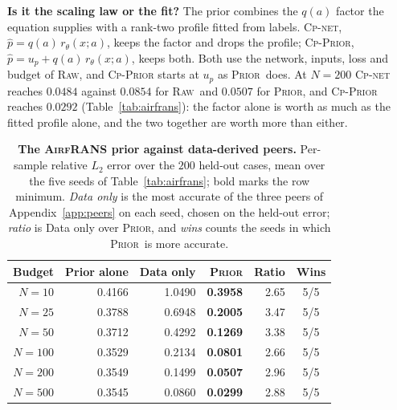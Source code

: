 \documentclass{article}
\newcommand{\armraw}{\textsc{Raw}}
\newcommand{\armprior}{\textsc{Prior}}
\begin{document}
\textbf{Is it the scaling law or the fit?} The prior combines the $q(a)$ factor the
equation supplies with a rank-two profile fitted from labels. \textsc{Cp-net},
$\hat p=q(a)\,r_\theta(x;a)$, keeps the factor and drops the profile;
\textsc{Cp-Prior}, $\hat p=u_p+q(a)\,r_\theta(x;a)$, keeps both. Both use the network,
inputs, loss and budget of \armraw, and \textsc{Cp-Prior} starts at $u_p$ as \armprior\
does. At $N{=}200$ \textsc{Cp-net} reaches $0.0484$ against $0.0854$ for \armraw\ and
$0.0507$ for \armprior, and \textsc{Cp-Prior} reaches $0.0292$
(Table~\ref{tab:airfrans}): the factor alone is worth as much as the fitted profile
alone, and the two together are worth more than either.

\begin{table}[t]
\centering
\caption{\textbf{The \textsc{AirfRANS} prior against data-derived peers.} Per-sample
relative $L_2$ error over the $200$ held-out cases, mean over the five seeds of
Table~\ref{tab:airfrans}; bold marks the row minimum. \emph{Data only} is the most
accurate of the three peers of Appendix~\ref{app:peers} on each seed, chosen on the
held-out error; \emph{ratio} is Data only over \armprior, and \emph{wins} counts the
seeds in which \armprior\ is more accurate.}
\label{tab:airfrans-full}
\footnotesize
\setlength{\tabcolsep}{17pt}
\renewcommand{\arraystretch}{0.7}
  \vspace{1mm}
\begin{tabular}{@{}rrrrrc@{}}
\toprule
Budget & Prior alone & Data only & \armprior & Ratio & Wins \\
\midrule
$N=10$  & 0.4166 & 1.0490 & \textbf{0.3958} & 2.65 & 5/5 \\
$N=25$  & 0.3788 & 0.6948 & \textbf{0.2005} & 3.47 & 5/5 \\
$N=50$  & 0.3712 & 0.4292 & \textbf{0.1269} & 3.38 & 5/5 \\
$N=100$ & 0.3529 & 0.2134 & \textbf{0.0801} & 2.66 & 5/5 \\
$N=200$ & 0.3549 & 0.1499 & \textbf{0.0507} & 2.96 & 5/5 \\
$N=500$ & 0.3545 & 0.0860 & \textbf{0.0299} & 2.88 & 5/5 \\
\bottomrule
\end{tabular}
  \vspace{-3mm}
\end{table}
\end{document}
